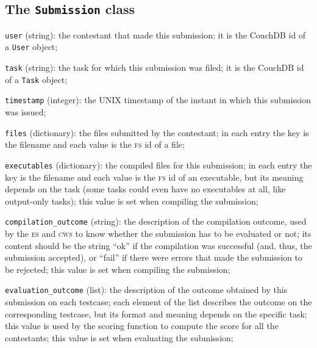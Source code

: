 \documentclass[a4paper,8pt]{amsart}
\newcommand{\FS}{\textsc{fs}}
\newcommand{\CWS}{\textsc{cws}}
\newcommand{\ES}{\textsc{es}}
\newenvironment{squishlist}{%
  \begin{list}{\textbullet}%
    { \setlength{\itemsep}{0pt}%
      \setlength{\parsep}{3pt}%
      \setlength{\topsep}{3pt}%
      \setlength{\partopsep}{0pt}%
      \setlength{\leftmargin}{1.5em}%
      \setlength{\labelwidth}{1em}%
      \setlength{\labelsep}{0.5em} }%
}{\end{list}}
\newcommand{\id}[1]{\texttt{#1}}
\begin{document}
\begin{multicols}{2}
\begin{squishlist}
  \end{squishlist}

  \subsection{The \id{Submission} class}

  \begin{squishlist}

  \item \id{user} (string): the contestant that made this submission;
    it is the CouchDB id of a \id{User} object;

  \item \id{task} (string): the task for which this submission was
    filed; it is the CouchDB id of a \id{Task} object;

  \item \id{timestamp} (integer): the UNIX timestamp of the instant in
    which this submission was issued;

  \item \id{files} (dictionary): the files submitted by the
    contestant; in each entry the key is the filename and each value
    is the \FS{} id of a file;

  \item \id{executables} (dictionary): the compiled files for this
    submission; in each entry the key is the filename and each value
    is the \FS{} id of an executable, but its meaning depends on the
    task (some tasks could even have no executables at all, like
    output-only tasks); this value is set when compiling the
    submission;

  \item \id{compilation\_outcome} (string): the description of the
    compilation outcome, used by the \ES{} and \CWS{} to know whether
    the submission has to be evaluated or not; its content should be
    the string ``ok'' if the compilation was successful (and, thus,
    the submission accepted), or ``fail'' if there were errors that
    made the submission to be rejected; this value is set when
    compiling the submission;

  \item \id{evaluation\_outcome} (list): the description of the
    outcome obtained by this submission on each testcase; each element
    of the list describes the outcome on the corresponding testcase,
    but its format and meaning depends on the specific task; this
    value is used by the scoring function to compute the score for all
    the contestants; this value is set when evaluating the submission;


\end{squishlist}
\end{multicols}
\end{document}
